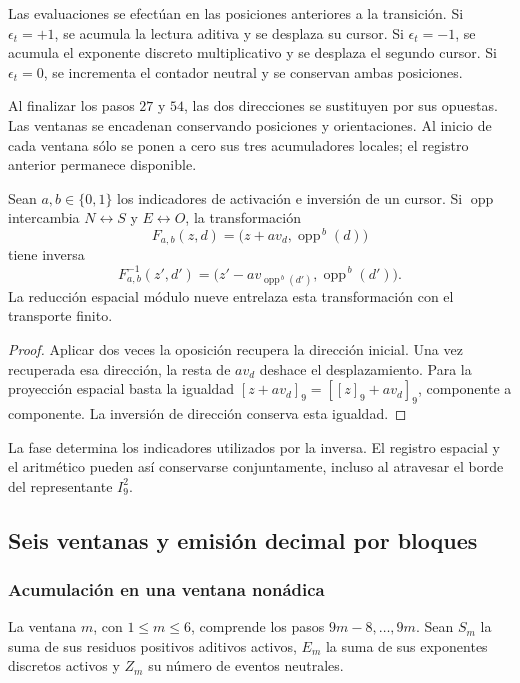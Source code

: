 Las evaluaciones se efectúan en las posiciones anteriores a la transición.
Si \(\epsilon_t=+1\), se acumula la lectura aditiva y se desplaza su cursor.
Si \(\epsilon_t=-1\), se acumula el exponente discreto multiplicativo y se
desplaza el segundo cursor. Si \(\epsilon_t=0\), se incrementa el contador
neutral y se conservan ambas posiciones.

Al finalizar los pasos \(27\) y \(54\), las dos direcciones se sustituyen
por sus opuestas. Las ventanas se encadenan conservando posiciones y
orientaciones. Al inicio de cada ventana sólo se ponen a cero sus tres
acumuladores locales; el registro anterior permanece disponible.

\begin{proposition}
\label{act21:tpk:inversion}
Sean \(a,b\in\{0,1\}\) los indicadores de activación e inversión de un
cursor. Si \(\operatorname{opp}\) intercambia \(N\leftrightarrow S\) y
\(E\leftrightarrow O\), la transformación
\[
 F_{a,b}(z,d)=\bigl(z+a v_d,\operatorname{opp}^{\,b}(d)\bigr)
\]
tiene inversa
\[
 F_{a,b}^{-1}(z',d')=
 \bigl(z'-a v_{\operatorname{opp}^{\,b}(d')},
       \operatorname{opp}^{\,b}(d')\bigr).
\]
La reducción espacial módulo nueve entrelaza esta transformación con el
transporte finito.
\end{proposition}
\begin{proof}
Aplicar dos veces la oposición recupera la dirección inicial. Una vez
recuperada esa dirección, la resta de \(a v_d\) deshace el desplazamiento.
Para la proyección espacial basta la igualdad
\([z+a v_d]_9=[[z]_9+a v_d]_9\), componente a componente. La inversión de
dirección conserva esta igualdad.
\end{proof}

La fase determina los indicadores utilizados por la inversa. El registro
espacial y el aritmético pueden así conservarse conjuntamente, incluso al
atravesar el borde del representante \(I_9^2\).

\subsection{Seis ventanas y emisión decimal por bloques}
\label{act21:tpk:emision}

\subsubsection{Acumulación en una ventana nonádica}

La ventana \(m\), con \(1\leq m\leq6\), comprende los pasos
\(9m-8,\ldots,9m\). Sean \(S_m\) la suma de sus residuos positivos
aditivos activos, \(E_m\) la suma de sus exponentes discretos activos y
\(Z_m\) su número de eventos neutrales.

